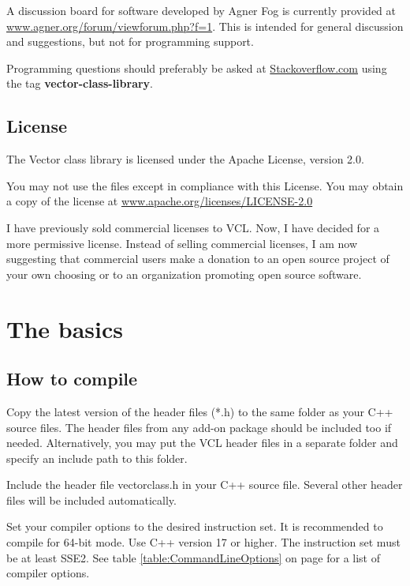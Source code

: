 \documentclass[vcl_manual.tex]{subfiles}
\begin{document}
A discussion board for software developed by Agner Fog is currently provided at
\href{https://www.agner.org/forum/viewforum.php?f=1}{www.agner.org/forum/viewforum.php?f=1}. This is intended for general discussion and suggestions, but not for programming support. 

Programming questions should preferably be asked at 
\href{https://stackoverflow.com}{Stackoverflow.com} using the tag {\bfseries vector-class-library}{\normalfont .} %


\section{License}\label{License}
The Vector class library is licensed under the Apache License, version 2.0.

You may not use the files except in compliance with this License.
You may obtain a copy of the license at
\href{https://www.apache.org/licenses/LICENSE-2.0}{www.apache.org/licenses/LICENSE-2.0}

I have previously sold commercial licenses to VCL. Now, I have decided for a more permissive license. Instead of selling commercial licenses, I am now suggesting that commercial users make a donation to an open source project of your own choosing or to an organization promoting open source software.


\chapter{The basics}\label{chap:TheBasics}
\section{How to compile} \label{HowToCompile}

Copy the latest version of the header files (*.h) to the same folder as your C++ source files. The header files from any add-on package should be included too if needed. Alternatively, you may put the VCL header files in a separate folder and specify an include path to this folder.

Include the header file vectorclass.h in your C++ source file.
Several other header files will be included automatically.

Set your compiler options to the desired instruction set. It is recommended to compile for 64-bit mode. Use C++ version 17 or higher. 
The instruction set must be at least SSE2. See table \ref{table:CommandLineOptions} on page \pageref{table:CommandLineOptions} for a list of compiler options. 
\end{document}
